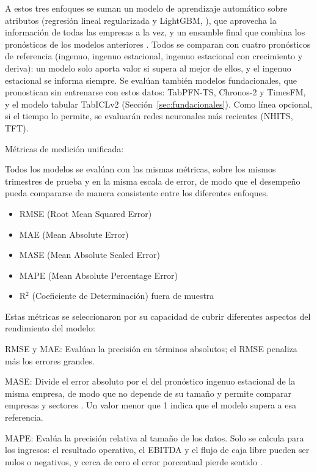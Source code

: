 \documentclass[12pt,letterpaper,oneside]{report}
\renewcommand{\_}{\UnderscoreOriginal\allowbreak}
\begin{document}
A estos tres enfoques se suman un modelo de aprendizaje automático sobre atributos (regresión lineal regularizada y LightGBM, \parencite{ke2017lightgbm}), que aprovecha la información de todas las empresas a la vez, y un ensamble final que combina los pronósticos de los modelos anteriores \parencite{monteromanso2020fforma, makridakis2020m4}. Todos se comparan con cuatro pronósticos de referencia (ingenuo, ingenuo estacional, ingenuo estacional con crecimiento y deriva): un modelo solo aporta valor si supera al mejor de ellos, y el ingenuo estacional se informa siempre. Se evalúan también modelos fundacionales, que pronostican sin entrenarse con estos datos: TabPFN-TS, Chronos-2 y TimesFM, y el modelo tabular TabICLv2 (Sección~\ref{sec:fundacionales}). Como línea opcional, si el tiempo lo permite, se evaluarán redes neuronales más recientes (NHITS, TFT).

Métricas de medición unificada:

Todos los modelos se evalúan con las mismas métricas, sobre los mismos trimestres de prueba y en la misma escala de error, de modo que el desempeño pueda compararse de manera consistente entre los diferentes enfoques.
\begin{itemize}
\item RMSE (Root Mean Squared Error)
\item MAE (Mean Absolute Error)
\item MASE (Mean Absolute Scaled Error)
\item MAPE (Mean Absolute Percentage Error)
\item R$^2$ (Coeficiente de Determinación) fuera de muestra
\end{itemize}
Estas métricas se seleccionaron por su capacidad de cubrir diferentes aspectos del rendimiento del modelo:

RMSE y MAE: Evalúan la precisión en términos absolutos; el RMSE penaliza más los errores grandes.

MASE: Divide el error absoluto por el del pronóstico ingenuo estacional de la misma empresa, de modo que no depende de su tamaño y permite comparar empresas y sectores \parencite{hyndman2006another}. Un valor menor que 1 indica que el modelo supera a esa referencia.

MAPE: Evalúa la precisión relativa al tamaño de los datos. Solo se calcula para los ingresos: el resultado operativo, el EBITDA y el flujo de caja libre pueden ser nulos o negativos, y cerca de cero el error porcentual pierde sentido \parencite{hyndman2006another}.
\end{document}
